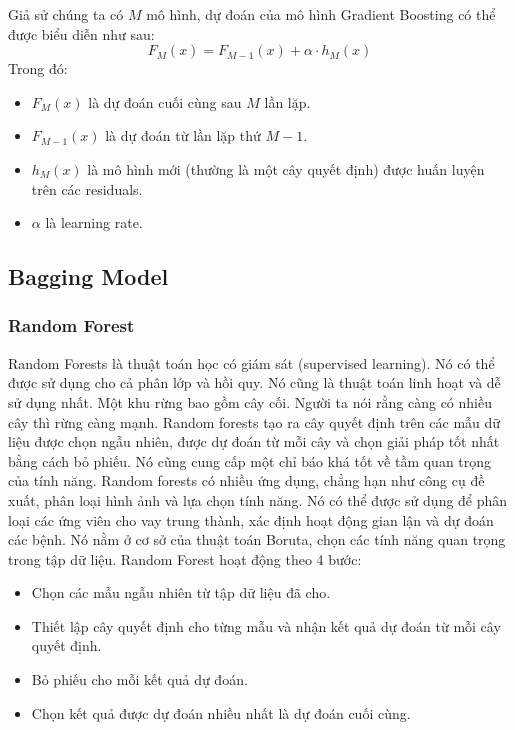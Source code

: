 \documentclass{ieeeojies}
\begin{document}
Giả sử chúng ta có $M$ mô hình, dự đoán của mô hình Gradient Boosting có thể được biểu diễn như sau:
\begin{equation}
F_M(x) = F_{M-1}(x) + \alpha \cdot h_M(x)
\end{equation}
Trong đó:
\begin{itemize}
    \item $F_M(x)$ là dự đoán cuối cùng sau $M$ lần lặp.
    \item $F_{M-1}(x)$ là dự đoán từ lần lặp thứ $M-1$.
    \item $h_M(x)$ là mô hình mới (thường là một cây quyết định) được huấn luyện trên các residuals.
    \item $\alpha$ là learning rate.
\end{itemize}

\subsection{Bagging Model}
\subsubsection{Random Forest}
Random Forests là thuật toán học có giám sát (supervised learning). Nó có thể được sử dụng cho cả phân lớp và hồi quy. Nó cũng là thuật toán linh hoạt và dễ sử dụng nhất. Một khu rừng bao gồm cây cối. Người ta nói rằng càng có nhiều cây thì rừng càng mạnh. Random forests tạo ra cây quyết định trên các mẫu dữ liệu được chọn ngẫu nhiên, được dự đoán từ mỗi cây và chọn giải pháp tốt nhất bằng cách bỏ phiếu. Nó cũng cung cấp một chỉ báo khá tốt về tầm quan trọng của tính năng. Random forests có nhiều ứng dụng, chẳng hạn như công cụ đề xuất, phân loại hình ảnh và lựa chọn tính năng. Nó có thể được sử dụng để phân loại các ứng viên cho vay trung thành, xác định hoạt động gian lận và dự đoán các bệnh. Nó nằm ở cơ sở của thuật toán Boruta, chọn các tính năng quan trọng trong tập dữ liệu.
Random Forest hoạt động theo 4 bước:
\begin{itemize}
    \item Chọn các mẫu ngẫu nhiên từ tập dữ liệu đã cho.
    \item Thiết lập cây quyết định cho từng mẫu và nhận kết quả dự đoán từ mỗi cây quyết định.
    \item Bỏ phiếu cho mỗi kết quả dự đoán.
    \item Chọn kết quả được dự đoán nhiều nhất là dự đoán cuối cùng.
\end{itemize}
\end{document}
